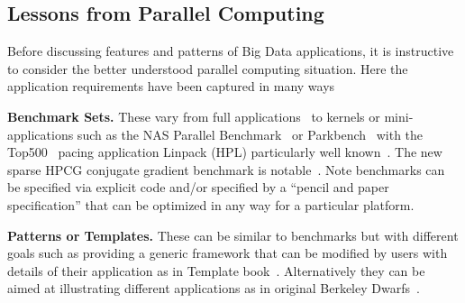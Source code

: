 \documentclass{acm_proc_article-sp}
\begin{document}
\subsection{Lessons from Parallel Computing}
Before discussing features and patterns of Big Data applications, it
is instructive to consider the better understood parallel computing
situation. Here the application requirements have been captured in
many ways

\begin{compactenum}
\item \textbf{Benchmark Sets.} These vary from full applications~\cite{b9} to
kernels or mini-applications such as the NAS Parallel Benchmark~\cite{b20,b25}
or Parkbench~\cite{b5} with the Top500~\cite{b16} pacing application Linpack
(HPL) particularly well known~\cite{b6}. The new sparse HPCG conjugate gradient
benchmark is notable~\cite{b6}. Note benchmarks can be specified via explicit
code and/or specified by a ``pencil and paper specification'' that can be
optimized in any way for a particular platform. 
\item \textbf{Patterns or Templates.} These can be similar to benchmarks but
with different goals such as providing a generic framework that can be modified
by users with details of their application as in Template book~\cite{b24,b29}.
Alternatively they can be aimed at illustrating different applications as in
original Berkeley Dwarfs~\cite{b8}.
\end{compactenum}
\end{document}
